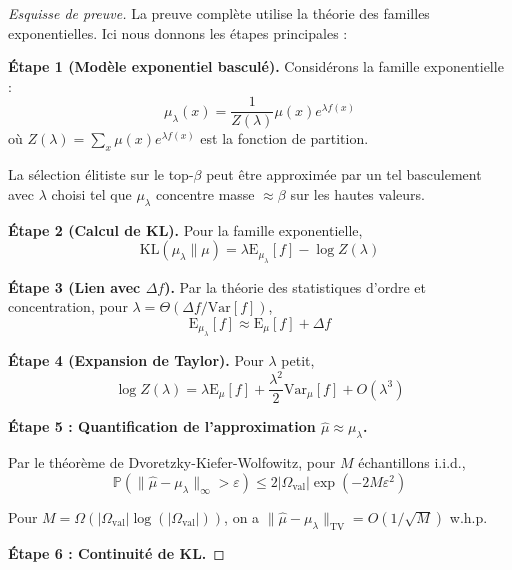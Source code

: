 \documentclass[12pt,a4paper]{article}
\theoremstyle{definition}
\theoremstyle{remark}
\newcommand{\E}{\text{E}}
\newcommand{\Var}{\text{Var}}
\newcommand{\KL}{\text{KL}}
\newcommand{\TV}{\text{TV}}
\begin{document}
	\begin{proof}[Esquisse de preuve]
		La preuve complète utilise la théorie des familles exponentielles. Ici nous donnons les étapes principales :
		
		\textbf{Étape 1 (Modèle exponentiel basculé).} Considérons la famille exponentielle :
		\begin{equation}
			\mu_\lambda(x) = \frac{1}{Z(\lambda)} \mu(x) e^{\lambda f(x)}
		\end{equation}
		où $Z(\lambda) = \sum_x \mu(x) e^{\lambda f(x)}$ est la fonction de partition.
		
		La sélection élitiste sur le top-$\beta$ peut être approximée par un tel basculement avec $\lambda$ choisi tel que $\mu_\lambda$ concentre masse $\approx \beta$ sur les hautes valeurs.
		
		\textbf{Étape 2 (Calcul de KL).} Pour la famille exponentielle,
		\begin{equation}
			\KL(\mu_\lambda \| \mu) = \lambda \E_{\mu_\lambda}[f] - \log Z(\lambda)
		\end{equation}
		
		\textbf{Étape 3 (Lien avec $\Delta f$).} Par la théorie des statistiques d'ordre et concentration, pour $\lambda = \Theta(\Delta f / \Var[f])$,
		\begin{equation}
			\E_{\mu_\lambda}[f] \approx \E_{\mu}[f] + \Delta f
		\end{equation}
		
		\textbf{Étape 4 (Expansion de Taylor).} Pour $\lambda$ petit,
		\begin{equation}
			\log Z(\lambda) = \lambda \E_\mu[f] + \frac{\lambda^2}{2}\Var_\mu[f] + O(\lambda^3)
		\end{equation}
		
		
    \textbf{Étape 5 : Quantification de l'approximation $\hat{\mu} \approx \mu_\lambda$.}
    
    Par le théorème de Dvoretzky-Kiefer-Wolfowitz, pour $M$ échantillons i.i.d.,
    \begin{equation}
        \mathbb{P}\left(\|\hat{\mu} - \mu_\lambda\|_{\infty} > \varepsilon\right) 
        \leq 2|\Omega_{\text{val}}| \exp(-2M\varepsilon^2)
    \end{equation}
    
    Pour $M = \Omega(|\Omega_{\text{val}}| \log(|\Omega_{\text{val}}|))$, 
    on a $\|\hat{\mu} - \mu_\lambda\|_{\TV} = O(1/\sqrt{M})$ w.h.p.
    
    \textbf{Étape 6 : Continuité de KL.}
    

\end{proof}
\end{document}
